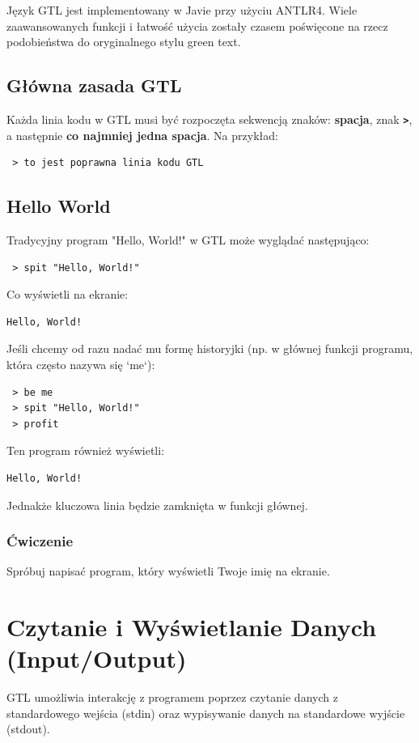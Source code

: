 \documentclass[12pt,a4paper]{article}
\begin{document}
Język GTL jest implementowany w Javie przy użyciu ANTLR4. Wiele zaawansowanych funkcji i łatwość użycia zostały czasem poświęcone na rzecz podobieństwa do oryginalnego stylu green text.

\subsection{Główna zasada GTL}
\label{ssec:main_property}
Każda linia kodu w GTL musi być rozpoczęta sekwencją znaków: \textbf{spacja}, znak \textbf{\texttt{>}}, a następnie \textbf{co najmniej jedna spacja}.
Na przykład:
\begin{lstlisting}
 > to jest poprawna linia kodu GTL
\end{lstlisting}

\subsection{Hello World}
\label{ssec:hello_world}
Tradycyjny program "Hello, World!" w GTL może wyglądać następująco:
\begin{lstlisting}
 > spit "Hello, World!"
\end{lstlisting}
Co wyświetli na ekranie:
\begin{verbatim}
Hello, World!
\end{verbatim}

Jeśli chcemy od razu nadać mu formę historyjki (np. w głównej funkcji programu, która często nazywa się `me`):
\begin{lstlisting}
 > be me
 > spit "Hello, World!"
 > profit
\end{lstlisting}
Ten program również wyświetli:
\begin{verbatim}
Hello, World!
\end{verbatim}
Jednakże kluczowa linia będzie zamknięta w funkcji głównej.

\subsubsection*{Ćwiczenie}
Spróbuj napisać program, który wyświetli Twoje imię na ekranie.

\newpage
\section{Czytanie i Wyświetlanie Danych (Input/Output)}
\label{sec:input_output}
GTL umożliwia interakcję z programem poprzez czytanie danych z standardowego wejścia (stdin) oraz wypisywanie danych na standardowe wyjście (stdout).
\end{document}
